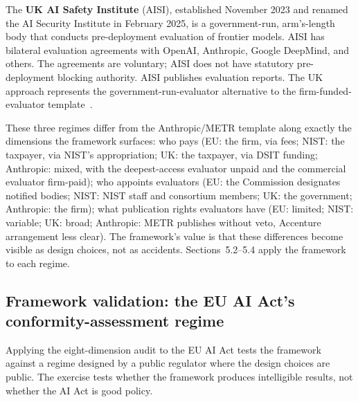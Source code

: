 The \textbf{UK AI Safety Institute} (AISI), established November 2023 and renamed the AI Security Institute in February 2025, is a government-run, arm's-length body that conducts pre-deployment evaluation of frontier models. AISI has bilateral evaluation agreements with OpenAI, Anthropic, Google DeepMind, and others. The agreements are voluntary; AISI does not have statutory pre-deployment blocking authority. AISI publishes evaluation reports. The UK approach represents the government-run-evaluator alternative to the firm-funded-evaluator template~\cite{ukwhitepaper2023}.

These three regimes differ from the Anthropic/METR template along exactly the dimensions the framework surfaces: who pays (EU: the firm, via fees; NIST: the taxpayer, via NIST's appropriation; UK: the taxpayer, via DSIT funding; Anthropic: mixed, with the deepest-access evaluator unpaid and the commercial evaluator firm-paid); who appoints evaluators (EU: the Commission designates notified bodies; NIST: NIST staff and consortium members; UK: the government; Anthropic: the firm); what publication rights evaluators have (EU: limited; NIST: variable; UK: broad; Anthropic: METR publishes without veto, Accenture arrangement less clear). The framework's value is that these differences become visible as design choices, not as accidents. Sections~5.2--5.4 apply the framework to each regime.

\subsection{Framework validation: the EU AI Act's conformity-assessment regime}

Applying the eight-dimension audit to the EU AI Act tests the framework against a regime designed by a public regulator where the design choices are public. The exercise tests whether the framework produces intelligible results, not whether the AI Act is good policy.

